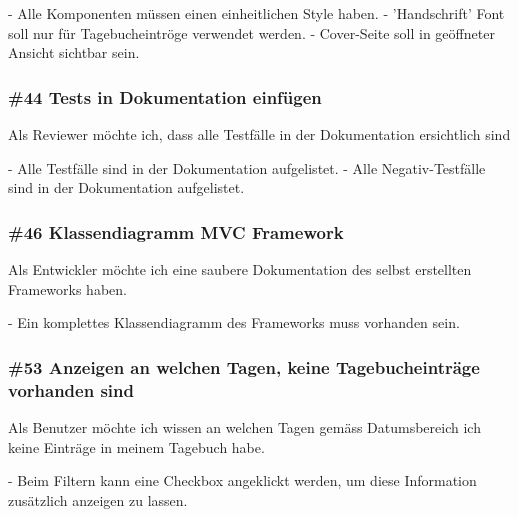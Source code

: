  \noindent
 - Alle Komponenten müssen einen einheitlichen Style haben.
 - 'Handschrift' Font soll nur für Tagebucheintröge verwendet werden.
 - Cover-Seite soll in geöffneter Ansicht sichtbar sein.

 \subsubsection*{\#44 Tests in Dokumentation einfügen}
 Als Reviewer möchte ich, dass alle Testfälle in der Dokumentation ersichtlich sind

 \noindent
 - Alle Testfälle sind in der Dokumentation aufgelistet.
 - Alle Negativ-Testfälle sind in der Dokumentation aufgelistet.

 \subsubsection*{\#46 Klassendiagramm MVC Framework}
 Als Entwickler möchte ich eine saubere Dokumentation des selbst erstellten Frameworks haben.

 \noindent
 - Ein komplettes Klassendiagramm des Frameworks muss vorhanden sein.

 \subsubsection*{\#53 Anzeigen an welchen Tagen, keine Tagebucheinträge vorhanden sind}
 Als Benutzer möchte ich wissen an welchen Tagen gemäss Datumsbereich ich keine Einträge in meinem Tagebuch habe.

 \noindent
 - Beim Filtern kann eine Checkbox angeklickt werden, um diese Information zusätzlich anzeigen zu lassen.

 